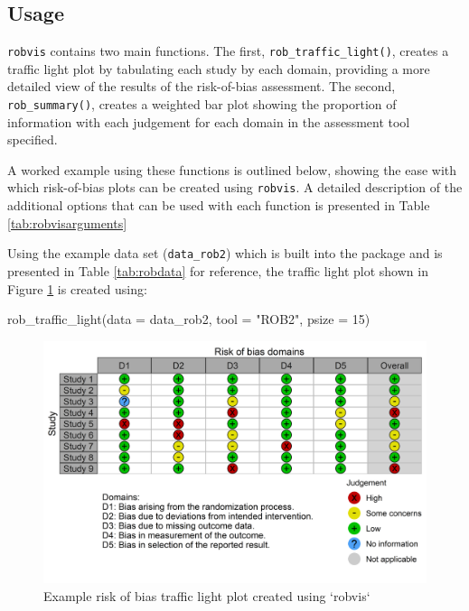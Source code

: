 \documentclass[a4paper, twoside]{templates/ociamthesis}
\newenvironment{Shaded}{\begin{snugshade}}{\end{snugshade}}
\newcommand{\AttributeTok}[1]{\textcolor[rgb]{0.77,0.63,0.00}{#1}}
\newcommand{\DecValTok}[1]{\textcolor[rgb]{0.00,0.00,0.81}{#1}}
\newcommand{\FunctionTok}[1]{\textcolor[rgb]{0.00,0.00,0.00}{#1}}
\newcommand{\NormalTok}[1]{#1}
\newcommand{\StringTok}[1]{\textcolor[rgb]{0.31,0.60,0.02}{#1}}
\renewenvironment{Shaded}
{
  \vspace{4pt}%
  \begin{snugshade}%
}{%
  \end{snugshade}%
  \vspace{4pt}%
}
\begin{document}
\hypertarget{usage-1}{%
\subsection{Usage}\label{usage-1}}

\texttt{robvis} contains two main functions. The first, \texttt{rob\_traffic\_light()}, creates a traffic light plot by tabulating each study by each domain, providing a more detailed view of the results of the risk-of-bias assessment. The second, \texttt{rob\_summary()}, creates a weighted bar plot showing the proportion of information with each judgement for each domain in the assessment tool specified.

A worked example using these functions is outlined below, showing the ease with which risk-of-bias plots can be created using \texttt{robvis}. A detailed description of the additional options that can be used with each function is presented in Table \ref{tab:robvisarguments}

Using the example data set (\texttt{data\_rob2}) which is built into the package and is presented in Table \ref{tab:robdata} for reference, the traffic light plot shown in Figure \ref{fig:trafficplot} is created using:

\begin{Shaded}
\begin{Highlighting}[]
\FunctionTok{rob\_traffic\_light}\NormalTok{(}\AttributeTok{data =}\NormalTok{ data\_rob2,}
                  \AttributeTok{tool =} \StringTok{"ROB2"}\NormalTok{,}
                  \AttributeTok{psize =} \DecValTok{15}\NormalTok{)}
\end{Highlighting}
\end{Shaded}

\begin{figure}
\includegraphics[width=1\linewidth]{figures/sys-rev-tools/example-rob-traffic-light-plot} \caption{Example risk of bias traffic light plot created using `robvis`}\label{fig:trafficplot}
\end{figure}
\end{document}

